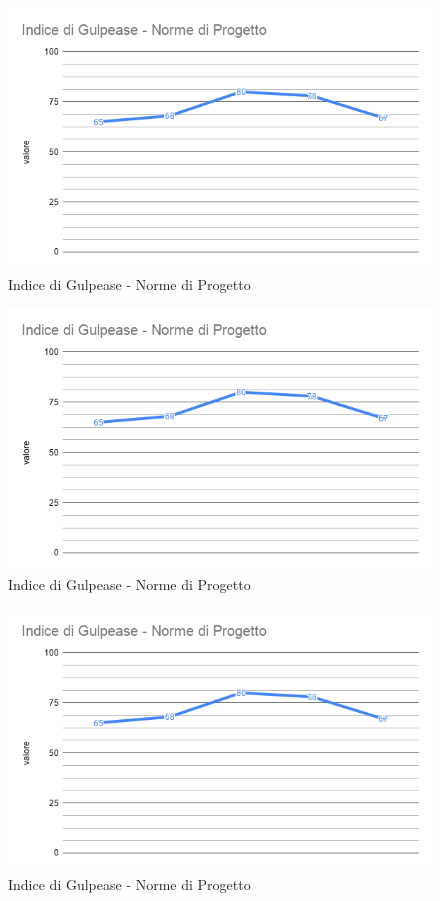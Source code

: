 \begin{figure}[H]
    \centering
    \includegraphics[width=13 cm]{source/sections/images/IdG_NdP.png}
    \caption{Indice di Gulpease - Norme di Progetto}
\end{figure}
\begin{figure}[H]
    \centering
    \includegraphics[width=13 cm]{source/sections/images/IdG_NdP.png}
    \caption{Indice di Gulpease - Norme di Progetto}
\end{figure}
\begin{figure}[H]
    \centering
    \includegraphics[width=13 cm]{source/sections/images/IdG_NdP.png}
    \caption{Indice di Gulpease - Norme di Progetto}
\end{figure}

